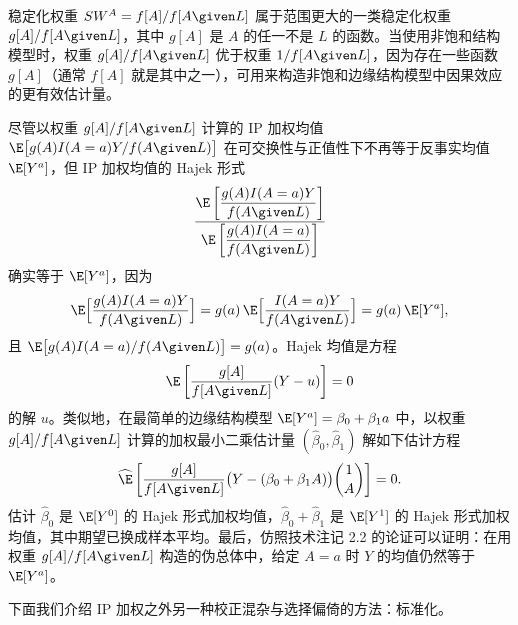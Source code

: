 \renewcommand{\TPname}{技术注记（Technical Point）}
\begin{techpoint}[关于稳定化权重的补充]
稳定化权重 $SW^{A}=f[A]/f[A\given L]$ 属于范围更大的一类稳定化权重 $g[A]/f[A\given L]$，其中 $g[A]$ 是 $A$ 的任一不是 $L$ 的函数。当使用非饱和结构模型时，权重 $g[A]/f[A\given L]$ 优于权重 $1/f[A\given L]$，因为存在一些函数 $g[A]$（通常 $f[A]$ 就是其中之一），可用来构造非饱和边缘结构模型中因果效应的更有效估计量。

尽管以权重 $g[A]/f[A\given L]$ 计算的 IP 加权均值 $\E\bigl[g(A)I(A=a)Y/f(A\given L)\bigr]$ 在可交换性与正值性下不再等于反事实均值 $\E[Y^{a}]$，但 IP 加权均值的 Hajek 形式
\[
\frac{\E\left[\dfrac{g(A)I(A=a)Y}{f(A\given L)}\right]}{\E\left[\dfrac{g(A)I(A=a)}{f(A\given L)}\right]}
\]
确实等于 $\E[Y^{a}]$，因为
\[
\E\Bigl[\frac{g(A)I(A=a)Y}{f(A\given L)}\Bigr]
= g(a)\,\E\Bigl[\frac{I(A=a)Y}{f(A\given L)}\Bigr]
= g(a)\,\E[Y^{a}],
\]
且 $\E\bigl[g(A)I(A=a)/f(A\given L)\bigr]=g(a)$。Hajek 均值是方程
\[
\E\left[\frac{g[A]}{f[A\given L]}(Y-u)\right]=0
\]
的解 $u$。类似地，在最简单的边缘结构模型 $\E[Y^{a}]=\beta_0+\beta_1a$ 中，以权重 $g[A]/f[A\given L]$ 计算的加权最小二乘估计量 $(\hat\beta_0,\hat\beta_1)$ 解如下估计方程
\[
\widehat{\E}\left[\frac{g[A]}{f[A\given L]}\bigl(Y-(\beta_0+\beta_1A)\bigr)\binom{1}{A}\right]=0.
\]
估计 $\hat\beta_0$ 是 $\E[Y^{0}]$ 的 Hajek 形式加权均值，$\hat\beta_0+\hat\beta_1$ 是 $\E[Y^{1}]$ 的 Hajek 形式加权均值，其中期望已换成样本平均。最后，仿照技术注记 2.2 的论证可以证明：在用权重 $g[A]/f[A\given L]$ 构造的伪总体中，给定 $A=a$ 时 $Y$ 的均值仍然等于 $\E[Y^{a}]$。
\end{techpoint}
\renewcommand{\TPname}{技术注记}

下面我们介绍 IP 加权之外另一种校正混杂与选择偏倚的方法：标准化。
